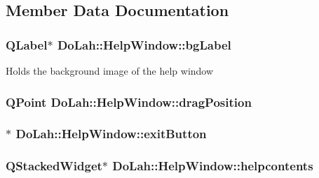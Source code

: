 \subsection{Member Data Documentation}
\hypertarget{class_do_lah_1_1_help_window_a88c39ed85fafa3b519656839282189d9}{}
\subsubsection[{bg\+Label}]{\setlength{\rightskip}{0pt plus 5cm}Q\+Label$\ast$ Do\+Lah\+::\+Help\+Window\+::bg\+Label}\label{class_do_lah_1_1_help_window_a88c39ed85fafa3b519656839282189d9}
Holds the background image of the help window \hypertarget{class_do_lah_1_1_help_window_ad49ac5080c3db6bd89f17d55e1e95ef1}{}
\subsubsection[{drag\+Position}]{\setlength{\rightskip}{0pt plus 5cm}Q\+Point Do\+Lah\+::\+Help\+Window\+::drag\+Position\hspace{0.3cm}{\ttfamily [private]}}\label{class_do_lah_1_1_help_window_ad49ac5080c3db6bd89f17d55e1e95ef1}
\hypertarget{class_do_lah_1_1_help_window_a64ca01a148e904b7308d6b63260dc199}{}
\subsubsection[{exit\+Button}]{$\ast$ Do\+Lah\+::\+Help\+Window\+::exit\+Button}\label{class_do_lah_1_1_help_window_a64ca01a148e904b7308d6b63260dc199}
\hypertarget{class_do_lah_1_1_help_window_a69e827d524d1087a8c5328ca03074801}{}
\subsubsection[{helpcontents}]{\setlength{\rightskip}{0pt plus 5cm}Q\+Stacked\+Widget$\ast$ Do\+Lah\+::\+Help\+Window\+::helpcontents}\label{class_do_lah_1_1_help_window_a69e827d524d1087a8c5328ca03074801}
\hypertarget{class_do_lah_1_1_help_window_a1a825a6344e3dd0eaf173bd4a13b27ff}{}
